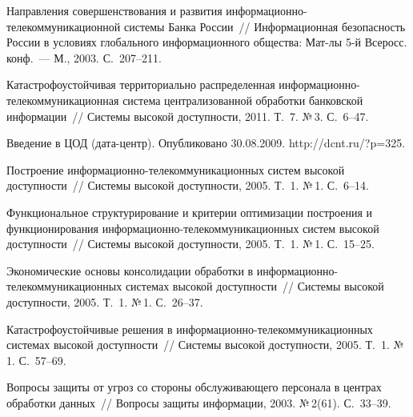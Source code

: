 \begin{multicols}{2}
{\small\frenchspacing
{%
\begin{thebibliography}{99}
Направления совершенствования и развития 
ин\-фор\-ма\-ци\-он\-но-те\-ле\-ком\-му\-ни\-ка\-ци\-он\-ной сис\-те\-мы Бан\-ка 
Рос\-сии~// Информационная безопасность России в условиях глобального информационного 
общества: Мат-лы 5-й Всеросс. конф.~--- М., 2003. С.~207--211.

Ката\-строфоустойчивая территориально распределенная 
ин\-фор\-ма\-ци\-он\-но-те\-ле\-ком\-му\-ни\-ка\-ци\-он\-ная сис\-те\-ма централизованной 
обработки банковской информации~// Системы высокой доступности, 2011. Т.~7. №\,3. 
С.~6--47.

Введение в ЦОД (дата-центр). Опубликовано 30.08.2009. {\sf http://dcnt.ru/?p=325}.

Построение ин\-фор\-ма\-ци\-он\-но-те\-ле\-ком\-му\-ни\-ка\-ци\-он\-ных сис\-тем высокой 
доступности~// Системы высокой доступности, 2005. Т.~1. №\,1. С.~6--14.

Функциональное структурирование и критерии оптимизации построения и 
функциони\-ро\-вания ин\-фор\-ма\-ци\-он\-но-те\-ле\-ком\-му\-ни\-ка\-ци\-он\-ных\linebreak
 сис\-тем 
высокой доступности~// Системы высокой доступности, 2005. Т.~1. №\,1. С.~15--25.

Экономические основы консолидации обработки в 
ин\-фор\-ма\-ци\-он\-но-те\-ле\-ком\-му\-ни\-ка\-ци\-он\-ных сис\-те\-мах высокой 
доступности~//\linebreak
Системы высокой доступности, 2005. Т.~1. №\,1. С.~26--37.

Катастрофоустойчивые решения в 
ин\-фор\-ма\-ци\-он\-но-те\-ле\-ком\-му\-ни\-ка\-ци\-он\-ных сис\-те\-мах высокой 
доступности~// Сис\-те\-мы высокой доступности, 2005. Т.~1. №\,1. С.~57--69.

Вопросы защиты от угроз со стороны обслуживающего персонала в центрах обработки 
данных~// Вопросы защиты информации, 2003. №\,2(61). С.~33--39.


\end{thebibliography}}}
\end{multicols}
